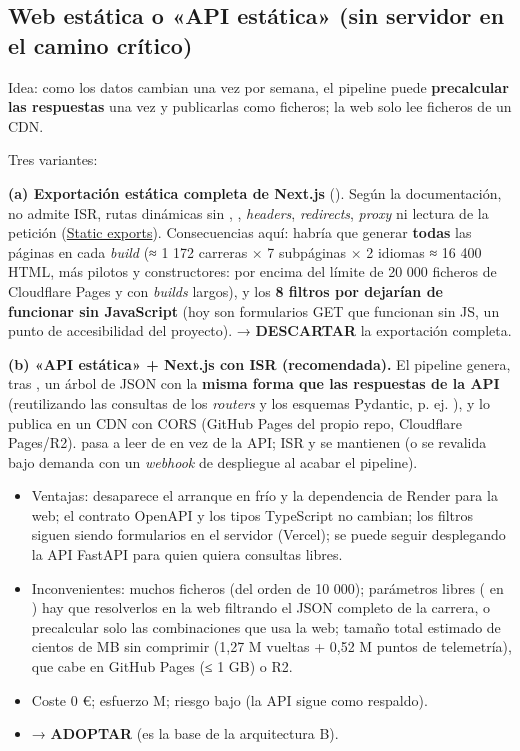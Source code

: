 \subsection{Web estática o «API estática» (sin servidor en el camino crítico)}

Idea: como los datos cambian una vez por semana, el pipeline puede \textbf{precalcular las respuestas} una vez y publicarlas como ficheros; la web solo lee ficheros de un CDN.

Tres variantes:

\textbf{(a) Exportación estática completa de Next.js} (). Según la documentación, no admite ISR, rutas dinámicas sin , , \emph{headers}, \emph{redirects}, \emph{proxy} ni lectura de la petición (\href{https://nextjs.org/docs/app/guides/static-exports}{Static exports}). Consecuencias aquí: habría que generar \textbf{todas} las páginas en cada \emph{build} (≈ 1 172 carreras × 7 subpáginas × 2 idiomas ≈ 16 400 HTML, más pilotos y constructores: por encima del límite de 20 000 ficheros de Cloudflare Pages y con \emph{builds} largos), y los \textbf{8 filtros por  dejarían de funcionar sin JavaScript} (hoy son formularios GET que funcionan sin JS, un punto de accesibilidad del proyecto). → \textbf{DESCARTAR} la exportación completa.

\textbf{(b) «API estática» + Next.js con ISR (recomendada).} El pipeline genera, tras , un árbol de JSON con la \textbf{misma forma que las respuestas de la API} (reutilizando las consultas de los \emph{routers} y los esquemas Pydantic, p. ej. ), y lo publica en un CDN con CORS (GitHub Pages del propio repo, Cloudflare Pages/R2).  pasa a leer de  en vez de la API; ISR y  se mantienen (o se revalida bajo demanda con un \emph{webhook} de despliegue al acabar el pipeline).

\begin{itemize}
\item Ventajas: desaparece el arranque en frío y la dependencia de Render para la web; el contrato OpenAPI y los tipos TypeScript no cambian; los filtros siguen siendo formularios en el servidor (Vercel); se puede seguir desplegando la API FastAPI para quien quiera consultas libres.
\item Inconvenientes: muchos ficheros (del orden de 10 000); parámetros libres ( en ) hay que resolverlos en la web filtrando el JSON completo de la carrera, o precalcular solo las combinaciones que usa la web; tamaño total estimado de cientos de MB sin comprimir (1,27 M vueltas + 0,52 M puntos de telemetría), que cabe en GitHub Pages (≤ 1 GB) o R2.
\item Coste 0 €; esfuerzo M; riesgo bajo (la API sigue como respaldo).
\item → \textbf{ADOPTAR} (es la base de la arquitectura B).
\end{itemize}

